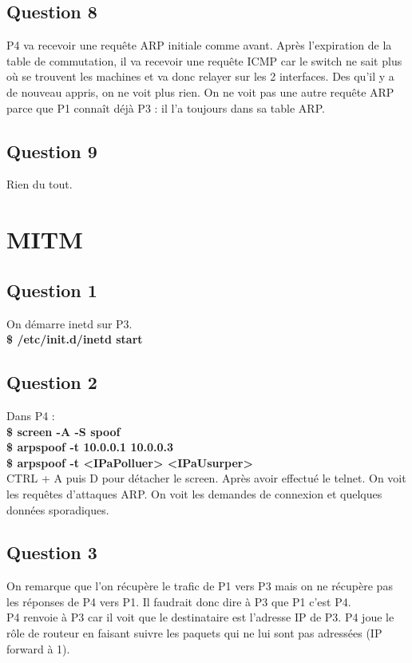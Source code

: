 \documentclass[a4paper]{article}
\begin{document}
		\subsection{Question 8}
P4 va recevoir une requête ARP initiale comme avant. Après l'expiration de la table de commutation, il va recevoir une requête ICMP car le switch ne sait plus où se trouvent les machines et va donc relayer sur les 2 interfaces. Des qu'il y a de nouveau appris, on ne voit plus rien. On ne voit pas une autre requête ARP parce que P1 connaît déjà P3 : il l'a toujours dans sa table ARP. 

		\subsection{Question 9}
Rien du tout.

	\section{MITM}

		\subsection{Question 1}
		
On démarre inetd sur P3. \\
\textbf{\$ /etc/init.d/inetd start}

		\subsection{Question 2}
Dans P4 :\\

\textbf{\$ screen -A -S spoof} \\
\textbf{\$ arpspoof -t 10.0.0.1 10.0.0.3} \\
\textbf{\$ arpspoof -t <IPaPolluer> <IPaUsurper>} \\

CTRL + A puis D pour détacher le screen. Après avoir effectué le telnet. On voit les requêtes d'attaques ARP. On voit les demandes de connexion et quelques données sporadiques. 

		\subsection{Question 3}

On remarque que l'on récupère le trafic de P1 vers P3 mais on ne récupère pas les réponses de P4 vers P1. Il faudrait donc dire à P3 que P1 c'est P4. \\

P4 renvoie à P3 car il voit que le destinataire est l'adresse IP de P3. P4 joue le rôle de routeur en faisant suivre les paquets qui ne lui sont pas adressées (IP forward à 1). 		
	
\end{document}
